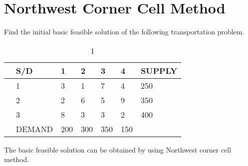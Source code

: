 \documentclass[journal,12pt,twocolumn]{IEEEtran}
\begin{document}
\section{Northwest Corner Cell Method}
\begin{problem}
Find the initial basic feasible solution of the following transportation problem.
\begin{table}[!h]
\begin{center}
\begin{tabular}{l  l | l l l l | l  }
                 
                 & S/D & 1 & 2 & 3 & 4 &  SUPPLY  \\
\hline
& 1 & 3 & 1 & 7 & 4 & 250 \\ 
& 2 & 2 & 6 & 5 & 9 & 350  \\ 
& 3 & 8 & 3 & 3 & 2 & 400 \\ 
\hline
&DEMAND& 200&300&350&150\\ 
\end{tabular}
\end{center}
\caption{1}
\end{table}


\end{problem}
\solution
The basic feasible solution can be obtained by using Northwest corner cell method.
\end{document}
